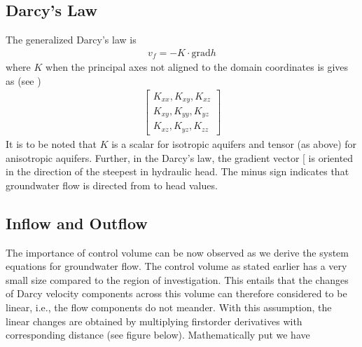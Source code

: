 \documentclass[letterpaper,10pt,english]{jupyterBook}
\begin{document}
\subsection{Darcy’s Law}
\label{\detokenize{content/flow/L7/17_quantify_flow:darcy-s-law}}
\sphinxAtStartPar
The generalized Darcy’s law is
\begin{equation*}
\begin{split}
v_f = -K \cdot \text{grad}h
\end{split}
\end{equation*}
\sphinxAtStartPar
where \(K\) when the principal axes not aligned to the domain coordinates is gives as (see {\hyperref[\detokenize{content/flow/L6/16_darcy_law_3D::doc}]{}})
\begin{equation*}
\begin{split}
\begin{bmatrix}
K_{xx}, K_{xy},  K_{xz} \\
K_{xy}, K_{yy}, K_{yz}\\
K_{xz}, K_{yz}, K_{zz}
\end{bmatrix}
\end{split}
\end{equation*}
\sphinxAtStartPar
It is to be noted that \(K\) is a scalar for isotropic aquifers and tensor (as above) for anisotropic aquifers. Further, in the Darcy’s law, the gradient vector {[}\sphinxhyphen{}{]} is oriented in the direction of the steepest  in hydraulic head. The minus sign indicates that groundwater flow is directed from  to  head values.


\subsection{Inflow and Outflow}
\label{\detokenize{content/flow/L7/17_quantify_flow:inflow-and-outflow}}
\sphinxAtStartPar
The importance of control volume can be now observed as we derive the system equations for groundwater flow. The control volume as stated earlier has a very small size compared to the region of investigation. This entails that the changes of Darcy velocity components across this volume can therefore considered to be linear, i.e., the flow components do not meander. With this assumption, the linear changes are obtained by multiplying first\sphinxhyphen{}order derivatives with corresponding distance (see figure below). Mathematically put we have
\end{document}
